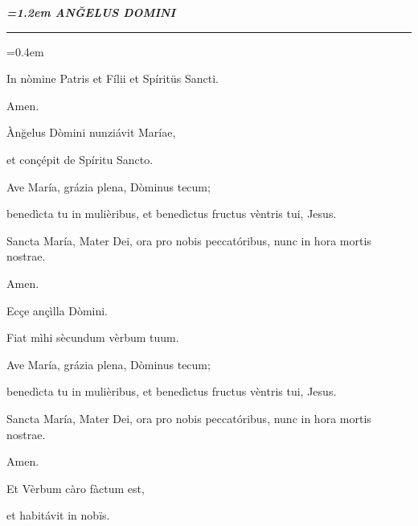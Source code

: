 \documentclass[twoside,10pt]{article}
\begin{document}
\pagestyle{empty}
{
  \begin{center}
  {\bfseries\itshape\large{}\font=1.2em \uppercase{anğelus domini}}
  \end{center}
}

{
  \begin{center}
  \rule{20em}{0.4pt}
  \end{center}
}

{
  \setlength\parindent{2em}\font=0.4em

  \bigskip

  \noindent In nòmine Patris et Fílii et Spíritüs Sancti.
  
  Amen.

  \bigskip

   Ànğelus Dòmini nunziávit Maríae,

  \smallskip

   et conçépit de Spíritu Sancto.

  \bigskip

  \noindent Ave María, grázia plena, Dòminus tecum;
  
  benedìcta tu in mulièribus, et benedìctus fructus vèntris tui, Jesus.

  Sancta María, Mater Dei, ora pro nobis peccatóribus, nunc in hora mortis nostrae.

  Amen.

  \bigskip

   Ecçe ançìlla Dòmini.

  \smallskip

   Fiat mìhi sècundum vèrbum tuum.

  \bigskip

  \noindent Ave María, grázia plena, Dòminus tecum;
  
  benedìcta tu in mulièribus, et benedìctus fructus vèntris tui, Jesus.

  Sancta María, Mater Dei, ora pro nobis peccatóribus, nunc in hora mortis nostrae.

  Amen.

  \bigskip

   Et Vèrbum càro fàctum est,

  \smallskip

   et habitávit in nobïs.

  \bigskip

}
\end{document}
